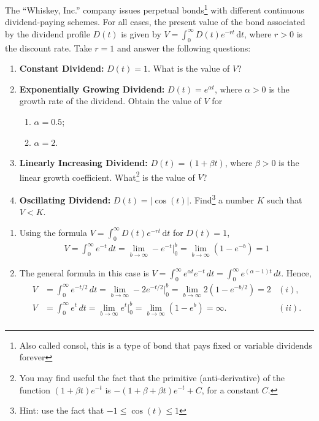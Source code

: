 \documentclass[11pt]{exam}
\begin{document}
\begin{questions}
\question[2]
The ``Whiskey, Inc.'' company issues perpetual bonds\footnote{Also called consol, this is a type of bond that pays fixed or variable dividends forever} with different continuous dividend-paying schemes. For all cases, the present value of the bond associated by the dividend profile $D(t)$ is given by $V = \int_{0}^{\infty} D(t) e^{-rt} \, \mathrm{d} t$, where $r > 0$ is the discount rate. Take $r = 1$ and answer the following questions:
\begin{enumerate}[leftmargin = 0.5cm, label = (\alph*), rightmargin = 0.2cm]
   \item \textbf{Constant Dividend:} $D(t) = 1$. What is the value of $V$?
   \item \textbf{Exponentially Growing Dividend:} $D(t) = e^{\alpha t}$, where $\alpha > 0$ is the growth rate of the dividend. Obtain the value of $V$ for
   \begin{enumerate}[leftmargin = 0.5cm, label = (\roman*), rightmargin = 0.2cm]
        \item $\alpha = 0.5$;
        \item $\alpha = 2$.
   \end{enumerate}
   \item \textbf{Linearly Increasing Dividend:} $D(t) = (1 + \beta t)$, where $\beta > 0$ is the linear growth coefficient. What\footnote{You may find useful the fact that the primitive (anti-derivative) of the function $(1 + \beta t)e^{-t}$ is $-\left( 1 + \beta + \beta t \right)e^{-t} + C$, for a constant $C$.} is the value of $V$? 
   \item \textbf{Oscillating Dividend:} $D(t) = |\cos(t)|$. Find\footnote{Hint: use the fact that $-1 \leq \cos(t) \leq 1$} a number $K$ such that $V < K$.
\end{enumerate}

\begin{solution}[0cm]

    \begin{enumerate}[leftmargin = 0.5cm, label = (\alph*), rightmargin = 0.2cm]
        \item Using the formula $V = \int_{0}^{\infty} D(t) e^{-rt} \, \mathrm{d} t$ for $D(t) = 1$,
        \begin{align*}
            V = \int_0^\infty e^{-t} \, dt = \lim_{b\rightarrow\infty} -e^{-t}\big|_0^b = \lim_{b\rightarrow\infty} (1-e^{-b}) = 1
        \end{align*}

        \item The general formula in this case is $V = \int_0^\infty e^{\alpha t} e^{-t} \, dt = \int_0^\infty e^{(\alpha - 1)t} \, dt$. Hence,
        \begin{align*}
            V &= \int_0^\infty e^{-t/2} \, dt = \lim_{b\rightarrow\infty} -2e^{-t/2}\big|_0^b = \lim_{b\rightarrow\infty} 2(1-e^{-b/2}) = 2 & (i), \\
            V &= \int_0^\infty e^{t} \, dt = \lim_{b\rightarrow\infty} e^{t}\big|_0^b = \lim_{b\rightarrow\infty} (1-e^{b}) = \infty. & (ii).\\
        \end{align*}


\end{enumerate}
\end{solution}
\end{questions}
\end{document}

